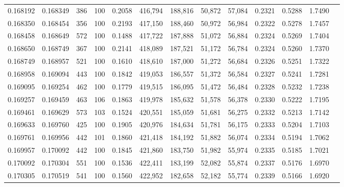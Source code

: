 \begin{tabular}{rrrrrrrrrrrrr}
0.168192 & 0.168349 &   386 & 100 &                                     0.2058 & 416,794 & 188,816 &  50,872 &  57,084 & 0.2321 & 0.5288 & 1.7490 \\
0.168350 & 0.168454 &   356 & 100 &                                     0.2193 & 417,150 & 188,460 &  50,972 &  56,984 & 0.2322 & 0.5278 & 1.7457 \\
0.168458 & 0.168649 &   572 & 100 &                                     0.1488 & 417,722 & 187,888 &  51,072 &  56,884 & 0.2324 & 0.5269 & 1.7404 \\
0.168650 & 0.168749 &   367 & 100 &                                     0.2141 & 418,089 & 187,521 &  51,172 &  56,784 & 0.2324 & 0.5260 & 1.7370 \\
0.168749 & 0.168957 &   521 & 100 &                                     0.1610 & 418,610 & 187,000 &  51,272 &  56,684 & 0.2326 & 0.5251 & 1.7322 \\
0.168958 & 0.169094 &   443 & 100 &                                     0.1842 & 419,053 & 186,557 &  51,372 &  56,584 & 0.2327 & 0.5241 & 1.7281 \\
0.169095 & 0.169254 &   462 & 100 &                                     0.1779 & 419,515 & 186,095 &  51,472 &  56,484 & 0.2328 & 0.5232 & 1.7238 \\
0.169257 & 0.169459 &   463 & 106 &                                     0.1863 & 419,978 & 185,632 &  51,578 &  56,378 & 0.2330 & 0.5222 & 1.7195 \\
0.169461 & 0.169629 &   573 & 103 &                                     0.1524 & 420,551 & 185,059 &  51,681 &  56,275 & 0.2332 & 0.5213 & 1.7142 \\
0.169633 & 0.169760 &   425 & 100 &                                     0.1905 & 420,976 & 184,634 &  51,781 &  56,175 & 0.2333 & 0.5204 & 1.7103 \\
0.169761 & 0.169956 &   442 & 101 &                                     0.1860 & 421,418 & 184,192 &  51,882 &  56,074 & 0.2334 & 0.5194 & 1.7062 \\
0.169957 & 0.170092 &   442 & 100 &                                     0.1845 & 421,860 & 183,750 &  51,982 &  55,974 & 0.2335 & 0.5185 & 1.7021 \\
0.170092 & 0.170304 &   551 & 100 &                                     0.1536 & 422,411 & 183,199 &  52,082 &  55,874 & 0.2337 & 0.5176 & 1.6970 \\
0.170305 & 0.170519 &   541 & 100 &                                     0.1560 & 422,952 & 182,658 &  52,182 &  55,774 & 0.2339 & 0.5166 & 1.6920 \\

\end{tabular}
